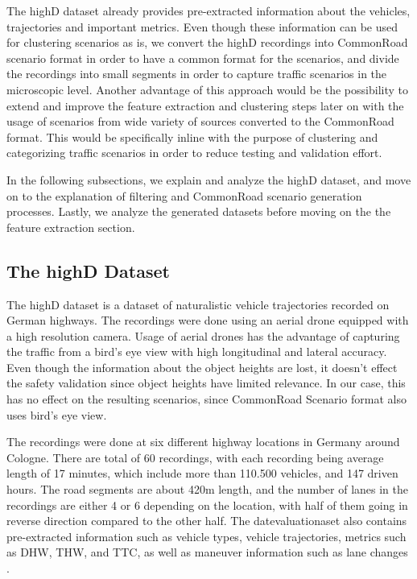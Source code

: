\documentclass[conference]{IEEEtran}
\begin{document}
The highD dataset already provides pre-extracted information about the vehicles, trajectories and important metrics. Even though these information can be used for clustering scenarios as is, we convert the highD recordings into CommonRoad scenario format \cite{althoff2017commonroad} in order to have a common format for the scenarios, and divide the recordings into small segments in order to capture traffic scenarios in the microscopic level. Another advantage of this approach would be the possibility to extend and improve the feature extraction and clustering steps later on with the usage of scenarios from wide variety of sources converted to the CommonRoad format. This would be specifically inline with the purpose of clustering and categorizing traffic scenarios in order to reduce testing and validation effort.

In the following subsections, we explain and analyze the highD dataset, and move on to the explanation of filtering and CommonRoad scenario generation processes. Lastly, we analyze the generated datasets before moving on the the feature extraction section.

\subsection{The highD Dataset}
\label{subsection:highd dataset}

The highD dataset is a dataset of naturalistic vehicle trajectories recorded on German highways. The recordings were done using an aerial drone equipped with a high resolution camera. Usage of aerial drones has the advantage of capturing the traffic from a bird's eye view with high longitudinal and lateral accuracy. Even though the information about the object heights are lost, it doesn't effect the safety validation since object heights have limited relevance. In our case, this has no effect on the resulting scenarios, since CommonRoad Scenario format also uses bird's eye view.

The recordings were done at six different highway locations in Germany around Cologne. There are total of 60 recordings, with each recording being average length of 17 minutes, which include more than 110.500 vehicles, and 147 driven hours. The road segments are about 420m length, and the number of lanes in the recordings are either 4 or 6 depending on the location, with half of them going in reverse direction compared to the other half. The datevaluationaset also contains pre-extracted information such as vehicle types, vehicle trajectories, metrics such as DHW, THW, and TTC, as well as maneuver information such as lane changes \cite{highDdataset}.
\end{document}

